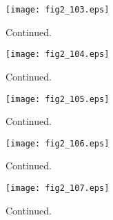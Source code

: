 \documentclass[preprint]{aastex}
\begin{document}
\setcounter{figure}{1}
\begin{figure}[t]
\centering
\texttt{[image: fig2\_103.eps]}
\caption{
Continued. 
}
\label{Fig2}
\end{figure}
\clearpage



\setcounter{figure}{1}
\begin{figure}[t]
\centering
\texttt{[image: fig2\_104.eps]}
\caption{
Continued. 
}
\label{Fig2}
\end{figure}
\clearpage



\setcounter{figure}{1}
\begin{figure}[t]
\centering
\texttt{[image: fig2\_105.eps]}
\caption{
Continued. 
}
\label{Fig2}
\end{figure}
\clearpage



\setcounter{figure}{1}
\begin{figure}[t]
\centering
\texttt{[image: fig2\_106.eps]}
\caption{
Continued. 
}
\label{Fig2}
\end{figure}
\clearpage



\setcounter{figure}{1}
\begin{figure}[t]
\centering
\texttt{[image: fig2\_107.eps]}
\caption{
Continued. 
}
\label{Fig2}
\end{figure}
\clearpage
\end{document}
